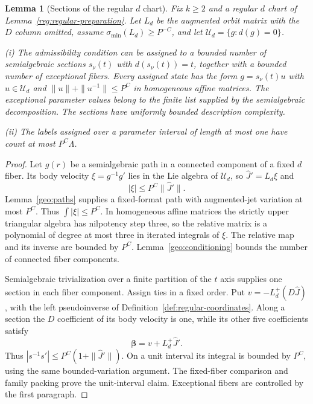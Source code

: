 \documentclass[11pt]{amsart}
\makeatletter
\newtheorem{lemma}[theorem]{Lemma}
\theoremstyle{definition}
\theoremstyle{remark}
\numberwithin{equation}{section}
\newcommand{\equationalias}[1]{\begingroup\protected@edef\@currentlabel{\p@equation\theequation}\protected@edef\@currentHref{equation.\theHequation}\label{#1}\endgroup}
\makeatother
\begin{document}
\begin{lemma}[Sections of the regular $d$ chart]\label{reg:d-sections}
Fix $k\ge2$ and a regular $d$ chart of Lemma~\ref{reg:regular-preparation}. Let $L_d$ be the augmented orbit matrix with the $D$ column omitted, assume $\sigma_{\min}(L_d)\ge P^{-C}$, and let $\mathcal U_d=\{g:d(g)=0\}$.

\noindent\textup{(i)} The admissibility condition can be assigned to a bounded number of semialgebraic sections $s_\nu(t)$ with $d(s_\nu(t))=t$, together with a bounded number of exceptional fibers. Every assigned state has the form $g=s_\nu(t)u$ with $u\in\mathcal U_d$ and $\|u\|+\|u^{-1}\|\le P^C$ in homogeneous affine matrices. The exceptional parameter values belong to the finite list supplied by the semialgebraic decomposition. The sections have uniformly bounded description complexity.

\noindent\textup{(ii)} The labels assigned over a parameter interval of length at most one have count at most $P^C\Lambda$.
\end{lemma}
\begin{proof}
Let $g(r)$ be a semialgebraic path in a connected component of a fixed $d$ fiber. Its body velocity $\xi=g^{-1}g'$ lies in the Lie algebra of $\mathcal U_d$, so $\widehat J'=L_d\xi$ and
\[
|\xi|\le P^C\|\widehat J'\|.
\]
Lemma~\ref{geo:paths} supplies a fixed-format path with augmented-jet variation at most $P^C$. Thus $\int|\xi|\le P^C$. In homogeneous affine matrices the strictly upper triangular algebra has nilpotency step three, so the relative matrix is a polynomial of degree at most three in iterated integrals of $\xi$. The relative map and its inverse are bounded by $P^C$. Lemma~\ref{geo:conditioning} bounds the number of connected fiber components.

Semialgebraic trivialization over a finite partition of the $t$ axis \cite[Theorem 5.46]{BPR} supplies one section in each fiber component. Assign ties in a fixed order. Put $v=-L_d^+(D\widehat J)$, with the left pseudoinverse of Definition~\ref{def:regular-coordinates}. Along a section the $D$ coefficient of its body velocity is one, while its other five coefficients satisfy
\begin{equation}\label{reg:d-section-rates}
\boldsymbol\beta=v+L_d^+\widehat J'.
\end{equation}
\equationalias{low:4:rd:least_squares}\equationalias{low:5:rd5:least_squares}
Thus $|s^{-1}s'|\le P^C(1+\|\widehat J'\|)$. On a unit interval its integral is bounded by $P^C$, using the same bounded-variation argument. The fixed-fiber comparison and family packing prove the unit-interval claim. Exceptional fibers are controlled by the first paragraph.
\end{proof}
\end{document}
